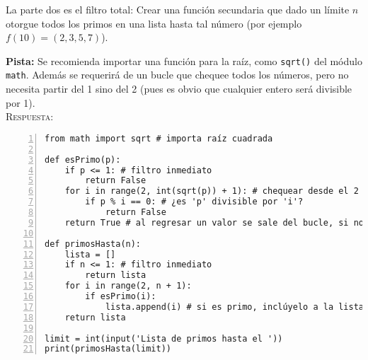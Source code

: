 \documentclass[11pt,twoside]{report}
\begin{document}
La parte dos es el filtro total: Crear una función secundaria que dado un límite $n$ otorgue todos los primos en una lista hasta tal número (por ejemplo $f(10)=(2,3,5,7)$).

{\bfseries Pista:} Se recomienda importar una función para la raíz, como \lstinline|sqrt()| del módulo \lstinline|math|. Además se requerirá de un bucle que chequee todos los números, pero no necesita partir del 1 sino del 2 (pues es obvio que cualquier entero será divisible por 1).\\
\textsc{Respuesta:}
\begin{lstlisting}[numbers=left]
from math import sqrt # importa raíz cuadrada

def esPrimo(p):
	if p <= 1: # filtro inmediato
		return False
	for i in range(2, int(sqrt(p)) + 1): # chequear desde el 2 hasta la -parte entera- de la raíz, el '+1', pues range llega hasta el anterior
		if p % i == 0: # ¿es 'p' divisible por 'i'?
			return False
	return True # al regresar un valor se sale del bucle, si no salió, ¡entonces es primo!

def primosHasta(n):
	lista = []
	if n <= 1: # filtro inmediato
		return lista
	for i in range(2, n + 1):
		if esPrimo(i):
			lista.append(i) # si es primo, inclúyelo a la lista
	return lista

limit = int(input('Lista de primos hasta el '))
print(primosHasta(limit))
\end{lstlisting}
\end{document}
